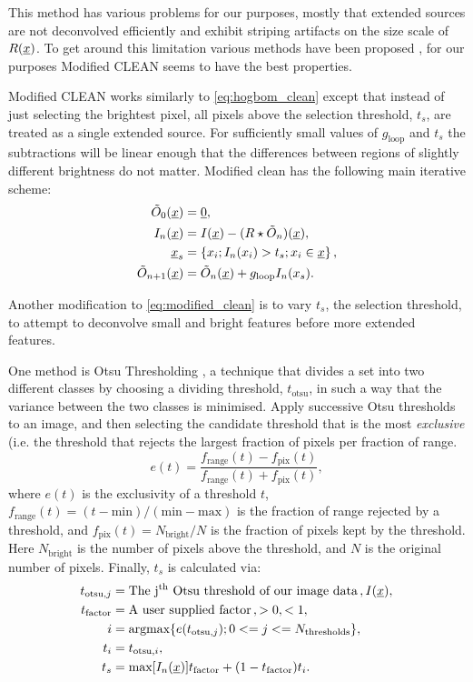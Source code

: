 This method has various problems for our purposes, mostly that extended sources are not deconvolved efficiently and exhibit striping artifacts on the size scale of $R(\underline{x})$. To get around this limitation various methods have been proposed \cite{Giovannelli21, Choi17, Wakker88, Cornwell08, Cornwell83}, for our purposes Modified CLEAN \cite{Steer84} seems to have the best properties.

Modified CLEAN works similarly to \eqref{eq:hogbom_clean} except that instead of just selecting the brightest pixel, all pixels above the selection threshold, $t_s$, are treated as a single extended source. For sufficiently small values of $g_\textrm{loop}$ and $t_s$ the subtractions will be linear enough that the differences between regions of slightly different brightness do not matter. Modified clean has the following main iterative scheme:
\begin{align}
	\tilde{O}_0(\underline{x}) &= \underline{0}, \nonumber \\
	I_n(\underline{x}) &= I(\underline{x}) - (R \star \tilde{O}_n)(\underline{x}), \nonumber \\
	\underline{x}_s &= \left\lbrace x_i; I_n(x_i) > t_s; x_i \in \underline{x} \right\rbrace , \nonumber \\
	\tilde{O}_{n+1}(\underline{x}) &= \tilde{O}_n(\underline{x}) + g_\textrm{loop} I_n(x_s).
	\label{eq:modified_clean}
\end{align}



Another modification to \eqref{eq:modified_clean} is to vary $t_s$, the selection threshold, to attempt to deconvolve small and bright features before more extended features.

One method is Otsu Thresholding \cite{Otsu79,otsu_thresholding}, a technique that divides a set into two different classes by choosing a dividing threshold, $t_\textrm{otsu}$, in such a way that the variance between the two classes is minimised. Apply successive Otsu thresholds to an image, and then selecting the candidate threshold that is the most \emph{exclusive} (i.e. the threshold that rejects the largest fraction of pixels per fraction of range.
\[
	e(t) = \frac{f_\textrm{range}(t) - f_\textrm{pix}(t)}{f_\textrm{range}(t) + f_\textrm{pix}(t)} ,
	\label{eq:exclusivity}
\]
where $e(t)$ is the exclusivity of a threshold $t$, $f_\textrm{range}(t) = (t - \textrm{min})/(\textrm{min} - \textrm{max})$ is the fraction of range rejected by a threshold, and $f_\textrm{pix}(t) = N_\textrm{bright}/N$ is the fraction of pixels kept by the threshold. Here $N_\textrm{bright}$ is the number of pixels above the threshold, and $N$ is the original number of pixels. Finally, $t_s$ is calculated via:
\begin{align*}
	t_{\textrm{otsu},j} &= \textrm{The j\textsuperscript{th} Otsu threshold of our image data}\,, I(\underline{x}), \\
	t_\textrm{factor} &= \textrm{A user supplied factor}\,, >0, <1, \\
	i &= \textrm{argmax}\lbrace e(t_{\textrm{otsu},j}); 0 <= j <= N_\textrm{thresholds} \rbrace, \\
	t_i &= t_{\textrm{otsu},i}, \\
	t_s &= \textrm{max}[I_n(\underline{x})] t_\textrm{factor} + (1 - t_\textrm{factor}) t_i.
\end{align*}

